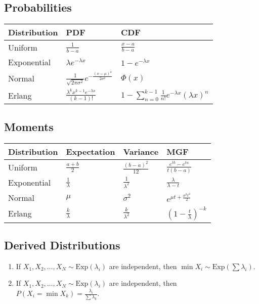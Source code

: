 \subsection*{Probabilities}
\begin{center}
  \begin{tabularx}{\textwidth}{XXX}
	\toprule
	Distribution & PDF & CDF\\
	\midrule
	Uniform & $\frac{1}{b-a}$ & $\frac{x-a}{b-a}$\\
	Exponential & $\lambda e^{-\lambda x}$ & $1 - e^{-\lambda x}$\\
	Normal & $\frac{1}{\sqrt{2\pi\sigma^2}} e^{-\frac{(x-\mu)^2}{2\sigma^2}}$ & $\Phi(x)$\\
	Erlang & $\frac{\lambda^k x^{k-1} e^{-\lambda x}}{(k-1)!}$ & $1 - \sum_{n=0}^{k-1}\frac{1}{n!}e^{-\lambda x}(\lambda x)^n$\\
  \end{tabularx}
\end{center}

\subsection*{Moments}
\begin{center}
  \begin{tabularx}{\textwidth}{XXXX}
	\toprule
	Distribution & Expectation & Variance & MGF\\
	\midrule
	Uniform & $\frac{a+b}{2}$ & $\frac{(b-a)^2}{12}$ & $\frac{e^{tb}-e^{ta}}{t(b-a)}$\\
	Exponential & $\frac{1}{\lambda}$ & $\frac{1}{\lambda^2}$ & $\frac{\lambda}{\lambda - t}$\\
	Normal & $\mu$ & $\sigma^2$ & $e^{\mu t + \frac{\sigma^2t^2}{2}}$\\
	Erlang & $\frac{k}{\lambda}$ & $\frac{k}{\lambda^2}$ & $\left(1 - \frac{t}{\lambda}\right)^{-k}$\\
  \end{tabularx}
\end{center}
\subsection*{Derived Distributions}
\begin{enumerate}
  \item If $X_1, X_2, \dots, X_N \sim \text{Exp}(\lambda_i)$ are independent, then $\min X_i \sim \text{Exp}(\sum \lambda_i)$.
  \item If $X_1, X_2, \dots, X_N \sim \text{Exp}(\lambda_i)$ are independent, then $P(X_i = \min X_k) = \frac{\lambda_i}{\sum \lambda_k}$.
\end{enumerate}
